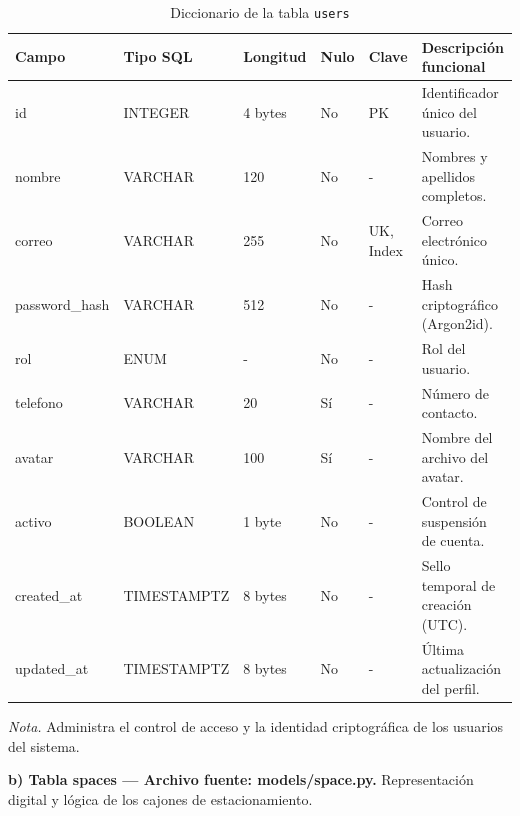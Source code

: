 \begin{table}[htbp]
\caption{Diccionario de la tabla \texttt{users}}
\label{tab:dict_users}
\begin{tabular}{@{}p{4cm} p{3cm} p{1.5cm} p{1cm} p{1.5cm} p{4cm}@{}}
\toprule
\textbf{Campo} & \textbf{Tipo SQL} & \textbf{Longitud} & \textbf{Nulo} & \textbf{Clave} & \textbf{Descripción funcional} \\
\midrule
id & INTEGER & 4 bytes & No & PK & Identificador único del usuario. \\
nombre & VARCHAR & 120 & No & - & Nombres y apellidos completos. \\
correo & VARCHAR & 255 & No & UK, Index & Correo electrónico único. \\
password\_hash & VARCHAR & 512 & No & - & Hash criptográfico (Argon2id). \\
rol & ENUM & - & No & - & Rol del usuario. \\
telefono & VARCHAR & 20 & Sí & - & Número de contacto. \\
avatar & VARCHAR & 100 & Sí & - & Nombre del archivo del avatar. \\
activo & BOOLEAN & 1 byte & No & - & Control de suspensión de cuenta. \\
created\_at & TIMESTAMPTZ & 8 bytes & No & - & Sello temporal de creación (UTC). \\
updated\_at & TIMESTAMPTZ & 8 bytes & No & - & Última actualización del perfil. \\
\bottomrule
\end{tabular}
\par\vspace{0.2cm}
\textit{Nota.} Administra el control de acceso y la identidad criptográfica de los usuarios del sistema.
\end{table}

\newpage\textbf{b) Tabla spaces — Archivo fuente: models/space.py.} Representación digital y lógica de los cajones de estacionamiento.

